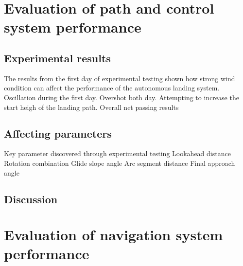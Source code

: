 \section{Evaluation of path and control system performance}
\subsection{Experimental results}
The results from the first day of experimental testing shown how strong wind condition can affect the performance of the autonomous landing system. 
Oscillation during the first day. Overshot both day. Attempting to increase the start heigh of the landing path. Overall net passing results
\subsection{Affecting parameters}
Key parameter discovered through experimental testing 
Lookahead distance
Rotation combination
Glide slope angle
Arc segment distance
Final approach angle
\subsection{Discussion}



\section{Evaluation of navigation system performance}\label{ss:NavigationResults}
